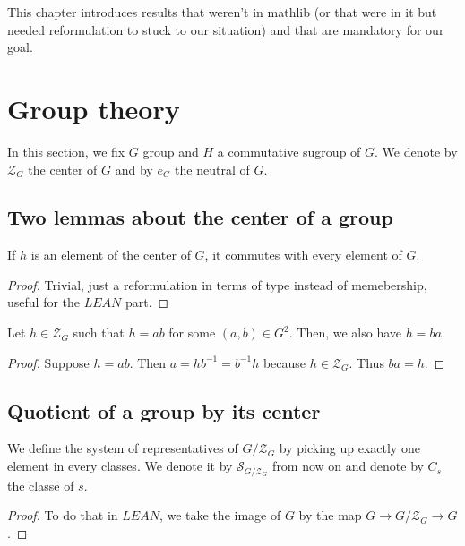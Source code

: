 This chapter introduces results that weren't in mathlib (or that were
in it but needed reformulation to stuck to our situation) and that are
mandatory for our goal.

\section{Group theory}
In this section, we fix $G$ group and $H$ a commutative sugroup of $G$.
We denote by $\mathcal{Z}_G$ the center of $G$ and by $e_G$ the neutral of $G$.

\subsection{Two lemmas about the center of a group}

\begin{proposition}
    \label{prop:center_mul_comm}
    \leanok
    If $h$ is an element of the center of $G$, it commutes with every element of $G$.
\end{proposition}
\begin{proof}
    \leanok
    Trivial, just a reformulation in terms of type instead of memebership, useful for the $LEAN$ part.
\end{proof}

\begin{proposition}
    \label{prop:center_mul_simp}
    \leanok
    Let $h\in\mathcal{Z}_G$ such that $h=ab$ for some $(a,b)\in G^2$. Then, we also have
    $h=ba$.
\end{proposition}
\begin{proof}
    \leanok
    Suppose $h=ab$. Then $a=hb^{-1}=b^{-1}h$ because $h\in\mathcal{Z}_G$. Thus $ba=h$.
\end{proof}

\subsection{Quotient of a group by its center}

\begin{definition}
    \label{def:system_of_repr_center_set}
    \leanok
    We define the system of representatives of $G/\mathcal{Z}_G$ by picking up exactly one element
    in every classes. We denote it by $\mathcal{S}_{G/\mathcal{Z}_G}$ from now on and denote
    by $C_s$ the classe of $s$.
    \begin{proof}
        \leanok
        To do that in $LEAN$, we take the image of $G$ by the map $G \rightarrow G/\mathcal{Z}_G\to G$.
    \end{proof}
\end{definition}

